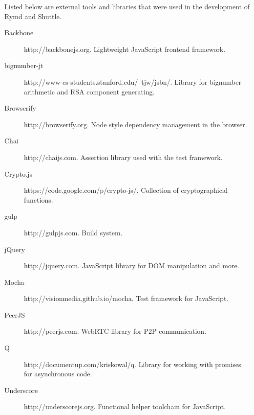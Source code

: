 Listed below are external tools and libraries that were used in the development of Rymd and Shuttle.

\begin{description}
  \item[Backbone] http://backbonejs.org. Lightweight JavaScript frontend framework.
  \item[bignumber-jt] http://www-cs-students.stanford.edu/~tjw/jsbn/. Library for bignumber arithmetic and RSA component generating.
  \item[Browserify] http://browserify.org. Node style dependency management in the browser.
  \item[Chai] http://chaijs.com. Assertion library used with the test framework.
  \item[Crypto.js] https://code.google.com/p/crypto-js/. Collection of cryptographical functions.
  \item[gulp] http://gulpjs.com. Build system.
  \item[jQuery] http://jquery.com. JavaScript library for DOM manipulation and more.
  \item[Mocha] http://visionmedia.github.io/mocha. Test framework for JavaScript.
  \item[PeerJS] http://peerjs.com. WebRTC library for P2P communication.
  \item[Q] http://documentup.com/kriskowal/q. Library for working with promises for asynchronous code.
  \item[Underscore] http://underscorejs.org. Functional helper toolchain for JavaScript.
\end{description}
